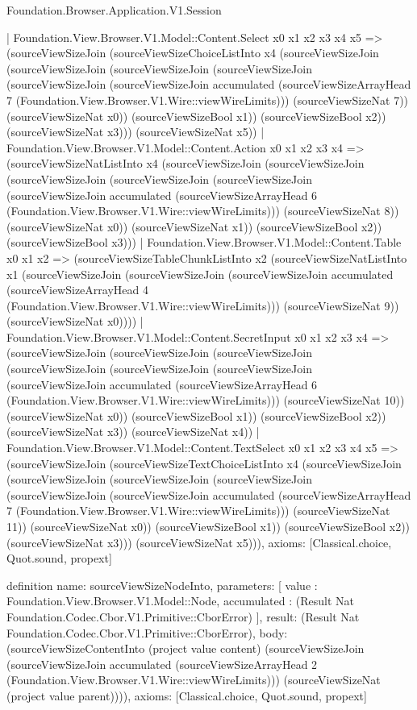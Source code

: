 \begin{lexlean}{Foundation.Browser.Application.V1.Session}
\begin{semanticmodule}
{    | Foundation.View.Browser.V1.Model::Content.Select x0 x1 x2 x3 x4 x5 => (sourceViewSizeJoin (sourceViewSizeChoiceListInto x4 (sourceViewSizeJoin (sourceViewSizeJoin (sourceViewSizeJoin (sourceViewSizeJoin (sourceViewSizeJoin (sourceViewSizeJoin accumulated (sourceViewSizeArrayHead 7 (Foundation.View.Browser.V1.Wire::viewWireLimits))) (sourceViewSizeNat 7)) (sourceViewSizeNat x0)) (sourceViewSizeBool x1)) (sourceViewSizeBool x2)) (sourceViewSizeNat x3))) (sourceViewSizeNat x5))
    | Foundation.View.Browser.V1.Model::Content.Action x0 x1 x2 x3 x4 => (sourceViewSizeNatListInto x4 (sourceViewSizeJoin (sourceViewSizeJoin (sourceViewSizeJoin (sourceViewSizeJoin (sourceViewSizeJoin (sourceViewSizeJoin accumulated (sourceViewSizeArrayHead 6 (Foundation.View.Browser.V1.Wire::viewWireLimits))) (sourceViewSizeNat 8)) (sourceViewSizeNat x0)) (sourceViewSizeNat x1)) (sourceViewSizeBool x2)) (sourceViewSizeBool x3)))
    | Foundation.View.Browser.V1.Model::Content.Table x0 x1 x2 => (sourceViewSizeTableChunkListInto x2 (sourceViewSizeNatListInto x1 (sourceViewSizeJoin (sourceViewSizeJoin (sourceViewSizeJoin accumulated (sourceViewSizeArrayHead 4 (Foundation.View.Browser.V1.Wire::viewWireLimits))) (sourceViewSizeNat 9)) (sourceViewSizeNat x0))))
    | Foundation.View.Browser.V1.Model::Content.SecretInput x0 x1 x2 x3 x4 => (sourceViewSizeJoin (sourceViewSizeJoin (sourceViewSizeJoin (sourceViewSizeJoin (sourceViewSizeJoin (sourceViewSizeJoin (sourceViewSizeJoin accumulated (sourceViewSizeArrayHead 6 (Foundation.View.Browser.V1.Wire::viewWireLimits))) (sourceViewSizeNat 10)) (sourceViewSizeNat x0)) (sourceViewSizeBool x1)) (sourceViewSizeBool x2)) (sourceViewSizeNat x3)) (sourceViewSizeNat x4))
    | Foundation.View.Browser.V1.Model::Content.TextSelect x0 x1 x2 x3 x4 x5 => (sourceViewSizeJoin (sourceViewSizeTextChoiceListInto x4 (sourceViewSizeJoin (sourceViewSizeJoin (sourceViewSizeJoin (sourceViewSizeJoin (sourceViewSizeJoin (sourceViewSizeJoin accumulated (sourceViewSizeArrayHead 7 (Foundation.View.Browser.V1.Wire::viewWireLimits))) (sourceViewSizeNat 11)) (sourceViewSizeNat x0)) (sourceViewSizeBool x1)) (sourceViewSizeBool x2)) (sourceViewSizeNat x3))) (sourceViewSizeNat x5))),
  axioms: [Classical.choice, Quot.sound, propext]
}

definition{
  name: sourceViewSizeNodeInto,
  parameters: [
    value : Foundation.View.Browser.V1.Model::Node,
    accumulated : (Result Nat Foundation.Codec.Cbor.V1.Primitive::CborError)
  ],
  result: (Result Nat Foundation.Codec.Cbor.V1.Primitive::CborError),
  body: (sourceViewSizeContentInto (project value content) (sourceViewSizeJoin (sourceViewSizeJoin accumulated (sourceViewSizeArrayHead 2 (Foundation.View.Browser.V1.Wire::viewWireLimits))) (sourceViewSizeNat (project value parent)))),
  axioms: [Classical.choice, Quot.sound, propext]
}


\end{semanticmodule}
\end{lexlean}
